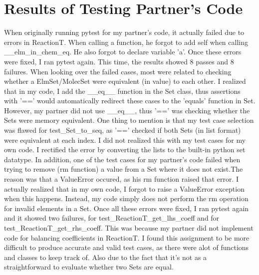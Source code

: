 \documentclass[12pt]{article}
\begin{document}
\section{Results of Testing Partner's Code}
When originally running pytest for my partner's code, it actually failed due to errors in ReactionT. When calling a function, he forgot to add self when calling \_\_elm\_in\_chem\_eq. He also forgot to declare variable 'a'.
\newline 
Once these errors were fixed, I ran pytest again. This time, the results showed 8 passes and 8 failures. When looking over the failed cases, most were related to checking whether a ElmSet/MolecSet were equivalent (in value) to each other. I realized that in my code, I add the \_\_eq\_\_ function in the Set class, thus assertions with '==' would automatically redirect these cases to the 'equals' function in Set. However, my partner did not use \_\_eq\_\_, thus '==' was checking whether the Sets were memory equivalent. \newline 
One thing to mention is that my test case selection was flawed for test\_Set\_to\_seq, as '==' checked if both Sets (in list format) were equivalent at each index. I did not realized this with my test cases for my own code. I rectified the error by converting the lists to the built-in python set datatype. \newline
In addition, one of the test cases for my partner's code failed when trying to remove (rm function) a value from a Set where it does not exist.The reason was that a ValueError occured, as his rm function raised that error. I actually realized that in my own code, I forgot to raise a ValueError exception when this happens. Instead, my code simply does not perform the rm operation for invalid elements in a Set. \newline
Once all these errors were fixed, I ran pytest again and it showed two failures, for test\_ReactionT\_get\_lhs\_coeff and for test\_ReactionT\_get\_rhs\_coeff. This was because my partner did not implement code for balancing coefficients in ReactionT. \newline \newline
I found this assignment to be more difficult to produce accurate and valid test cases, as there were alot of functions and classes to keep track of. Also due to the fact that it's not as a straightforward to evaluate whether two Sets are equal.
\end{document}

